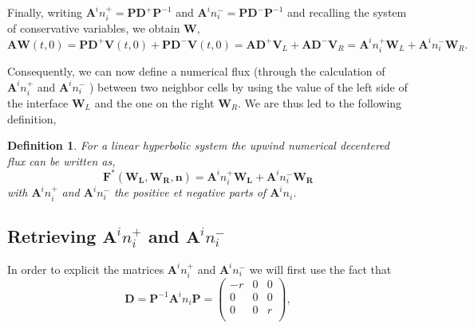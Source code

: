 \documentclass[a4paper,oneside,10pt]{report}
\newtheorem{mydef}{Definition}
\begin{document}
Finally, writing $\mathbf{A}^in_i^+= \mathbf{P}\mathbf{D}^+\mathbf{P}^{-1}$ and $\mathbf{A}^in_i^-= \mathbf{P}\mathbf{D}^-\mathbf{P}^{-1}$ and recalling the system of conservative variables, we obtain  $\mathbf{W}$,
 \begin{equation}
 \label{flux1}
\mathbf{A} \mathbf{W}(t,0) = \mathbf{P} \mathbf{D}^+\mathbf{V}(t,0) + \mathbf{P}\mathbf{D}^-\mathbf{V}(t,0)  =  \mathbf{A}\mathbf{D}^+\mathbf{V}_L  + \mathbf{A} \mathbf{D}^-\mathbf{V}_R = \mathbf{A}^in_i^+\mathbf{W}_L + \mathbf{A}^in_i^-\mathbf{W}_R.
\end{equation}
 
 Consequently, we can now define a numerical flux (through the calculation of $\mathbf{A}^i n_i^+$ and $\mathbf{A}^i n_i^-$ ) between two neighbor cells by using the value of the left side of the interface $\mathbf{W}_L$ and the one on the right $\mathbf{W}_R$. We are thus led to the following definition,
 
\begin{mydef}
For a linear hyperbolic system the upwind numerical decentered flux can be written as,
 \begin{equation}
 \mathbf{F}^*(\mathbf{W_L},\mathbf{W_R},\mathbf{n}) = \mathbf{A}^i n_i^+\mathbf{W_L} + \mathbf{A}^i n_i^-\mathbf{W_R}
 \end{equation}
with $\mathbf{A}^i n_i^+$ and $\mathbf{A}^i n_i^-$ the positive et negative parts of $\mathbf{A}^i n_i$.
\end{mydef}


\subsection{Retrieving $\mathbf{A}^i n_i^+$ and $\mathbf{A}^i n_i^-$}

In order to explicit the matrices $\mathbf{A}^i n_i^+$ and $\mathbf{A}^i n_i^-$ we will first use the fact that
\begin{equation}
\mathbf{D} =\mathbf{P}^{-1}\mathbf{A}^in_i\mathbf{P}=
\begin{pmatrix}
-r & 0 &0 \\
0& 0 & 0\\
0 & 0 & r\\
\end{pmatrix},
\end{equation}
\end{document}
